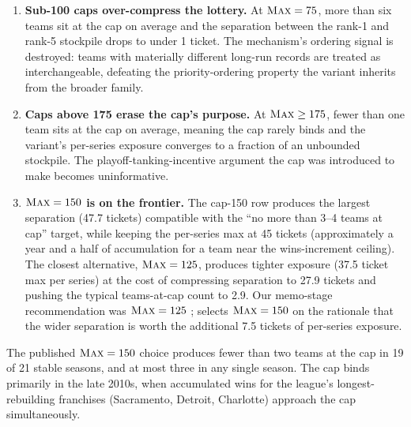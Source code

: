 \begin{enumerate}
    \item \textbf{Sub-100 caps over-compress the lottery.} At $\textup{\textsc{Max}} = 75$, more than six teams sit at the cap on average and the separation between the rank-1 and rank-5 stockpile drops to under 1 ticket. The mechanism's ordering signal is destroyed: teams with materially different long-run records are treated as interchangeable, defeating the priority-ordering property the variant inherits from the broader \cola{} family.
    \item \textbf{Caps above 175 erase the cap's purpose.} At $\textup{\textsc{Max}} \geq 175$, fewer than one team sits at the cap on average, meaning the cap rarely binds and the variant's per-series exposure converges to a fraction of an unbounded stockpile. The playoff-tanking-incentive argument the cap was introduced to make becomes uninformative.
    \item \textbf{$\textup{\textsc{Max}} = 150$ is on the frontier.} The cap-150 row produces the largest separation (47.7 tickets) compatible with the ``no more than 3--4 teams at cap'' target, while keeping the per-series max at 45 tickets (approximately a year and a half of accumulation for a team near the wins-increment ceiling). The closest alternative, $\textup{\textsc{Max}} = 125$, produces tighter exposure (37.5 ticket max per series) at the cost of compressing separation to 27.9 tickets and pushing the typical teams-at-cap count to 2.9. Our memo-stage recommendation was $\textup{\textsc{Max}} = 125$ \citep{rajan2026memo}; \citet{highley2026solvable5} selects $\textup{\textsc{Max}} = 150$ on the rationale that the wider separation is worth the additional 7.5 tickets of per-series exposure.
\end{enumerate}

The published $\textup{\textsc{Max}} = 150$ choice produces fewer than two teams at the cap in 19 of 21 stable seasons, and at most three in any single season. The cap binds primarily in the late 2010s, when accumulated wins for the league's longest-rebuilding franchises (Sacramento, Detroit, Charlotte) approach the cap simultaneously. 

